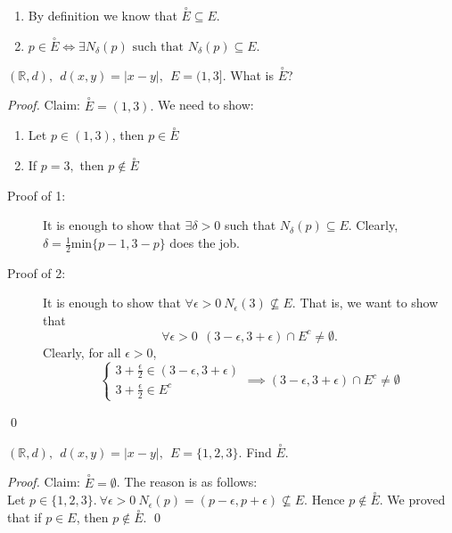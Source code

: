 \begin{note} \leavevmode \\
    \begin{enumerate}[$(*)$]
        \item By definition we know that $\overset{\circ}{E} \subseteq E.$
        \item $p \in \overset{\circ}{E} \iff \exists N_\delta (p) \text{ such that } N_\delta(p) \subseteq E.$
    \end{enumerate}
\end{note}

\begin{example}
    $(\mathbb{R}, d), ~~ d(x,y) = |x - y|, ~~ E = (1,3].$ What is $\overset{\circ}{E}$?
\end{example}
\begin{proof}
    Claim: $\overset{\circ}{E} = (1,3).$ We need to show:
    \begin{enumerate}[$(1)$]
        \item Let $p \in (1,3)$, then $p \in \overset{\circ}{E}$
        \item If $p = 3,$ then $p \not \in \overset{\circ}{E}$
    \end{enumerate}
    \begin{description}
        \item[Proof of 1: ]  It is enough to show that $\exists \delta > 0$ such that $N_\delta (p) \subseteq E$. Clearly, $\delta = \frac{1}{2} \text{min}\{p-1, 3-p\}$ does the job.
        \item[Proof of 2: ] It is enough to show that $\forall \epsilon > 0 ~N_\epsilon (3) \not \subseteq E.$ That is, we want to show that $$\forall \epsilon > 0 ~~(3 - \epsilon, 3 + \epsilon) \cap E^c \not = \emptyset.$$
        Clearly, for all $\epsilon > 0$,
        $$\begin{cases} 3 + \frac{\epsilon}{2} \in (3 - \epsilon, 3+ \epsilon) \\ 3 + \frac{\epsilon}{2} \in E^c \end{cases} \implies (3-\epsilon, 3 + \epsilon)\cap E^c \not = \emptyset$$
    \end{description}
    \qed
\end{proof}

\begin{example}
    $(\mathbb{R}, d), ~~d(x,y) = |x-y|, ~~ E = \{1,2,3\}.$ Find $\overset{\circ}{E}.$
\end{example}

\begin{proof}
    Claim: $\overset{\circ}{E} = \emptyset$.
    The reason is as follows: \leavevmode \\
    Let $p \in \{1,2,3\}. ~\forall \epsilon > 0 ~N_\epsilon (p) = (p- \epsilon, p + \epsilon)\not \subseteq E.$ Hence $p \not \in \overset{\circ}{E}.$ We proved that if $p \in E$, then $p \not \in \overset{\circ}{E}.$
    \qed
\end{proof}

